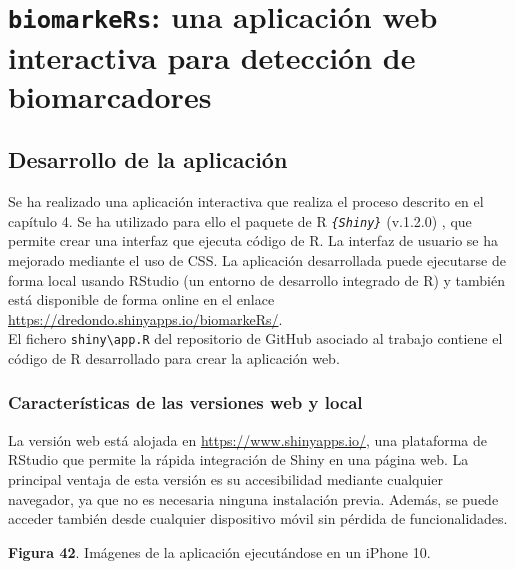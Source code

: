 \chapter{\texttt{biomarkeRs}: una aplicación web interactiva para detección de biomarcadores}

\section{Desarrollo de la aplicación}

Se ha realizado una aplicación interactiva que realiza el proceso descrito en el capítulo 4. Se ha utilizado para ello el paquete de R \textit{\texttt{\{Shiny\}}} (v.1.2.0) \cite{Chang2020}, que permite crear una interfaz que ejecuta código de R. La interfaz de usuario se ha mejorado mediante el uso de CSS. La aplicación desarrollada puede ejecutarse de forma local usando RStudio (un entorno de desarrollo integrado de R) \cite{RStudioTeam2020} y también está disponible de forma online en el enlace \url{https://dredondo.shinyapps.io/biomarkeRs/}.\\

El fichero \texttt{shiny\textbackslash app.R} del repositorio de GitHub asociado al trabajo \cite{Redondo-Sanchez2020} contiene el código de R desarrollado para crear la aplicación web.

\subsection{Características de las versiones web y local}

La versión web está alojada en \url{https://www.shinyapps.io/}, una plataforma de RStudio que permite la rápida integración de Shiny en una página web. La principal ventaja de esta versión es su accesibilidad mediante cualquier navegador, ya que no es necesaria ninguna instalación previa. Además, se puede acceder también desde cualquier dispositivo móvil sin pérdida de funcionalidades.\\

\begin{center}
	\textbf{Figura 42}. Imágenes de la aplicación ejecutándose en un iPhone 10.
\end{center}

